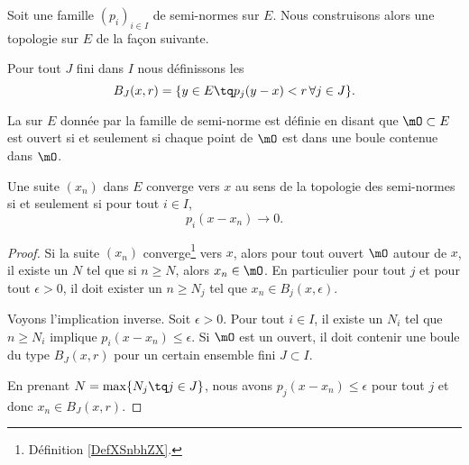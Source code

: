 Soit une famille \( (p_i)_{i\in I}\) de semi-normes sur \( E\). Nous construisons alors une topologie sur \( E\) de la façon suivante.

\begin{definition}
    Pour tout \( J\) fini dans \( I\) nous définissons les 
    \begin{equation}
        B_J(x,r)=\{ y\in E\tq p_j(y-x)<r\,\forall j\in J \}.
    \end{equation}

    La  sur \( E\) donnée par la famille de semi-norme est définie en disant que \( \mO\subset E\) est ouvert si et seulement si chaque point de \( \mO\) est dans une boule contenue dans \( \mO\).
\end{definition}

\begin{proposition} \label{PropQPzGKVk}
    Une suite \( (x_n)\) dans \( E\) converge vers \( x\) au sens de la topologie des semi-normes si et seulement si pour tout \( i\in I\),
    \begin{equation}
        p_i(x-x_n)\to 0.
    \end{equation}
\end{proposition}

\begin{proof}
    Si la suite \( (x_n)\) converge\footnote{Définition \ref{DefXSnbhZX}.} vers \( x\), alors pour tout ouvert \( \mO\) autour de \( x\), il existe un \( N\) tel que si \( n\geq N\), alors \( x_n\in\mO\). En particulier pour tout \( j\) et pour tout \( \epsilon>0\), il doit exister un \( n\geq N_j\) tel que \( x_n\in B_j(x,\epsilon)\).

    Voyons l'implication inverse. Soit \( \epsilon>0\). Pour tout \( i\in I\), il existe un \( N_i\) tel que \( n\geq N_i\) implique \( p_i(x-x_n)\leq \epsilon\). Si \( \mO\) est un ouvert, il doit contenir une boule du type \( B_J(x,r)\) pour un certain ensemble fini \( J\subset I\).

    En prenant \( N=\max\{ N_j\tq j\in J \}\), nous avons \( p_j(x-x_n)\leq \epsilon\) pour tout \( j\) et donc \( x_n\in B_J(x,r)\).
\end{proof}

